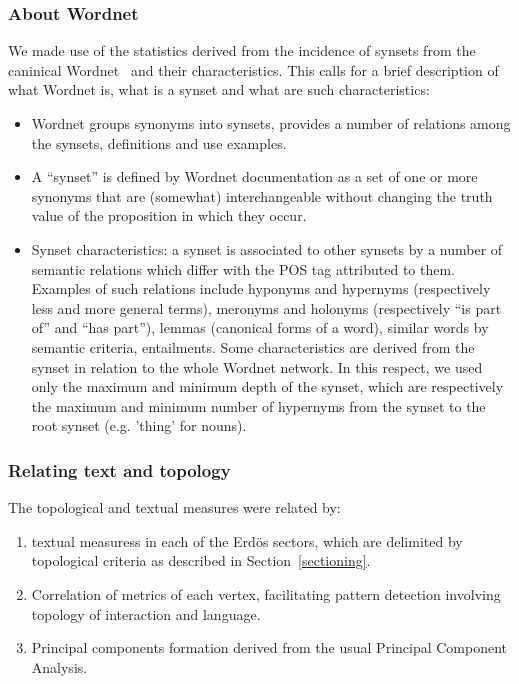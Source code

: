 \documentclass[review]{elsarticle}
\begin{document}
\subsubsection{About Wordnet}
We made use of the statistics derived from the incidence of synsets from the caninical Wordnet~\cite{wn} and their characteristics.
This calls for a brief description of what Wordnet is, what is a synset and what are such characteristics:
\begin{itemize}
\item Wordnet groups synonyms into synsets, provides a number of relations among the synsets, definitions and use examples.
\item A ``synset'' is defined by Wordnet documentation as a set of one or more synonyms that are (somewhat) interchangeable without changing the truth value of the proposition in which they occur.
\item Synset characteristics: a synset is associated to other synsets by a number of semantic relations which differ with the POS tag attributed to them.
Examples of such relations include hyponyms and hypernyms (respectively less and more general terms), meronyms and holonyms (respectively ``is part of'' and ``has part''), lemmas (canonical forms of a word), similar words by semantic criteria, entailments.
Some characteristics are derived from the synset in relation to the whole Wordnet network.
In this respect, we used only the maximum and minimum depth of the synset, which are respectively the maximum and minimum number of hypernyms from the synset to the root synset (e.g. 'thing' for nouns).
\end{itemize}

\subsubsection{Relating text and topology}\label{sec:ks}
The topological and textual measures were related by:
\begin{enumerate}
\item textual measuress in each of the Erdös sectors, which are delimited by topological criteria as described in Section~\ref{sectioning}.
\item Correlation of metrics of each vertex, facilitating pattern detection involving topology of interaction and language.
\item Principal components formation derived from the usual Principal Component Analysis.
\end{enumerate}
\end{document}
